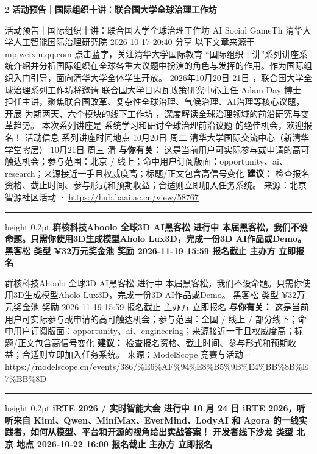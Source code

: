 \documentclass[10.5pt]{ctexart}
\begin{document}
\begin{multicols}{2}
{\large\bfseries 活动预告｜国际组织十讲：联合国大学全球治理工作坊}\par
活动预告｜国际组织十讲：联合国大学全球治理工作坊 AI Social GameTh 清华大学人工智能国际治理研究院 2026-10-17 20:40 分享 以下文章来源于mp.weixin.qq.com 点击蓝字，关注清华大学国际教育 “国际组织十讲”系列讲座系统介绍并分析国际组织在全球各重大议题中扮演的角色与发挥的作用。作为国际组织入门引导，面向清华大学全体学生开放。 2026年10月20日-21日 ，联合国大学全球治理系列工作坊将邀请 联合国大学日内瓦政策研究中心主任 Adam Day 博士 担任主讲，聚焦联合国改革、复杂性全球治理、气候治理、AI治理等核心议题，开展 为期两天、六个模块的线下工作坊 ，深度解读全球治理领域的前沿研究与变革趋势。 本次系列讲座是 系统学习和研讨全球治理前沿议题 的绝佳机会，欢迎报名！ 活动信息 系列讲座时间地点 10月20日 周二 清华大学国际交流中心（新清华学堂零层） 10月21日 周三 清
\textbf{与你有关：} 这是当前用户可实际参与或申请的高可触达机会；参与范围：北京 / 线上；命中用户订阅版面：opportunity、ai、research；来源接近一手且权威度高；标题/正文包含高信号变化
\textbf{建议：} 检查报名资格、截止时间、参与形式和预期收益；合适则立即加入任务系统。
{\footnotesize\color{ormuted} 来源：北京智源社区活动 · \url{https://hub.baai.ac.cn/view/58767}}
\vspace{2mm}
\hrule height 0.2pt
\vspace{2mm}
{\large\bfseries 群核科技Ahoolo 全球3D AI黑客松 进行中 本届黑客松，我们不设命题。只需你使用3D生成模型Aholo Lux3D，完成一份3D AI作品或Demo。 黑客松 类型 ¥32万元奖金池 奖励 2026-11-19 15:59 报名截止 主办方 立即报名}\par
群核科技Ahoolo 全球3D AI黑客松 进行中 本届黑客松，我们不设命题。只需你使用3D生成模型Aholo Lux3D，完成一份3D AI作品或Demo。 黑客松 类型 ¥32万元奖金池 奖励 2026-11-19 15:59 报名截止 主办方 立即报名
\textbf{与你有关：} 这是当前用户可实际参与或申请的高可触达机会；参与范围：全国 / 线上 / 部分线下；命中用户订阅版面：opportunity、ai、engineering；来源接近一手且权威度高；标题/正文包含高信号变化
\textbf{建议：} 检查报名资格、截止时间、参与形式和预期收益；合适则立即加入任务系统。
{\footnotesize\color{ormuted} 来源：ModelScope 竞赛与活动 · \url{https://modelscope.cn/events/386/%E6%AF%94%E8%B5%9B%E4%BB%8B%E7%BB%8D}}
\vspace{2mm}
\hrule height 0.2pt
\vspace{2mm}
{\large\bfseries iRTE 2026 / 实时智能大会 进行中 10 月 24 日 iRTE 2026，听听来自 Kimi、Qwen、MiniMax、EverMind、LodyAI 和 Agora 的一线实践者，如何从模型、平台和开源的视角给出实战答案！ 开发者线下沙龙 类型 北京 地点 2026-10-22 16:00 报名截止 主办方 立即报名}\par

\end{multicols}
\end{document}
